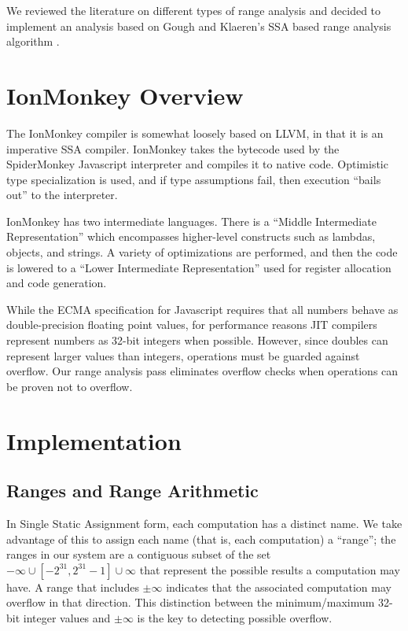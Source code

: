 \documentclass{article}
\begin{document}
We reviewed the literature on different types of range analysis and
decided to implement an analysis based on Gough and Klaeren's SSA
based range analysis algorithm \cite{Gough94eliminatingrange}.

\section{IonMonkey Overview}
The IonMonkey compiler is somewhat loosely based on LLVM, in that it is an
imperative SSA compiler. IonMonkey takes the bytecode used by the SpiderMonkey
Javascript interpreter and compiles it to native code. Optimistic type
specialization is used, and if type assumptions fail, then execution ``bails
out'' to the interpreter.

IonMonkey has two intermediate languages. There is a ``Middle Intermediate
Representation'' which encompasses higher-level constructs such as lambdas,
objects, and strings. A variety of optimizations are performed, and then the
code is lowered to a ``Lower Intermediate Representation'' used for register
allocation and code generation.

While the ECMA specification for Javascript requires that all numbers behave as
double-precision floating point values, for performance reasons JIT compilers
represent numbers as 32-bit integers when possible. However, since doubles can
represent larger values than integers, operations must be guarded against
overflow.  Our range analysis pass eliminates overflow checks when operations
can be proven not to overflow.

\section{Implementation}

\subsection{Ranges and Range Arithmetic}

In Single Static Assignment form, each computation has a distinct
name. We take advantage of this to assign each name (that is, each
computation) a ``range''; the ranges in our system are a contiguous
subset of the set ${-\infty} \cup [-2^{31}, 2^{31}-1] \cup {\infty}$
that represent the possible results a computation may have. A range
that includes $\pm \infty$ indicates that the associated
computation may overflow in that direction. This distinction between
the minimum/maximum 32-bit integer values and $\pm \infty$ is the key
to detecting possible overflow.
\end{document}
